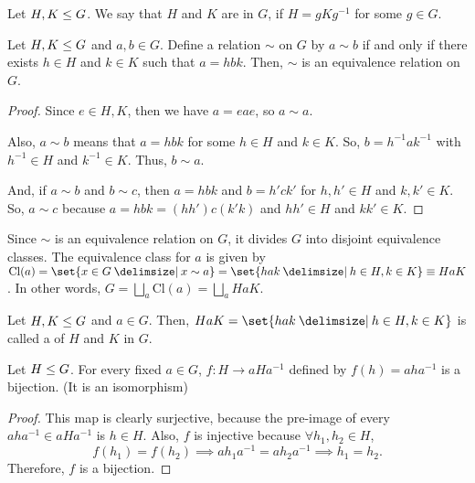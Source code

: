 \documentclass[11pt]{penrose}
\begin{document}
\begin{ndfn}
    Let $H, K \mathrel{\leq} G$. We say that $H$ and $K$ are  in $G$, if $H = g K g^{-1}$ for some $g \in G$.
\end{ndfn}

\begin{nprop}
    Let $H, K \mathrel{\leq} G$ and $a, b \in G$. Define a relation $\sim$ on $G$ by $a \sim b$ if and only if there exists $h \in H$ and $k \in K$ such that $a = hbk$. Then, $\sim$ is an equivalence relation on $G$.
\end{nprop}
\begin{proof}
    Since $e \in H, K$, then we have $a = e a e$, so $a \sim a$.

    Also, $a \sim b$ means that $a = hbk$ for some $h \in H$ and $k \in K$. So, $b = h^{-1} a k^{-1}$ with $h^{-1} \in H$ and $k^{-1} \in K$. Thus, $b \sim a$.

    And, if $a \sim b$ and $b \sim c$, then $a = hbk$ and $b = h'ck'$ for $h, h' \in H$ and $k, k' \in K$. So, $a \sim c$ because $a = h b k = (h h') c (k' k)$ and $hh' \in H$ and $kk' \in K$.
\end{proof}

\begin{remark}
    Since $\sim$ is an equivalence relation on $G$, it divides $G$ into disjoint equivalence classes. The equivalence class for $a$ is given by $\mathrm{Cl}(a) = \set{x \in G \st x \sim a} = \set{hak \st h \in H, k \in K} \equiv HaK$. In other words, $\displaystyle G = \bigsqcup_{a} \mathrm{Cl}(a) = \bigsqcup_{a} HaK$.

\end{remark}

\begin{ndfn}
    Let $H, K \mathrel{\leq} G$ and $a \in G$. Then, $HaK = \set{hak \st h \in H, k \in K}$ is called a  of $H$ and $K$ in $G$.
\end{ndfn}

\begin{nlemma}
    Let $H \mathrel{\leq} G$. For every fixed $a \in G$, $f : H \to a H a^{-1}$ defined by $f(h) = aha^{-1}$ is a bijection. (It is an isomorphism)
\end{nlemma}
\begin{proof}
    This map is clearly surjective, because the pre-image of every $aha^{-1} \in aHa^{-1}$ is $h \in H$. Also, $f$ is injective because $\forall h_{1}, h_{2} \in H$,
    \begin{equation*}
        f(h_{1}) = f(h_{2}) \implies ah_{1}a^{-1} = ah_{2}a^{-1} \implies h_{1} = h_{2}.
    \end{equation*}
    Therefore, $f$ is a bijection.
\end{proof}
\end{document}
